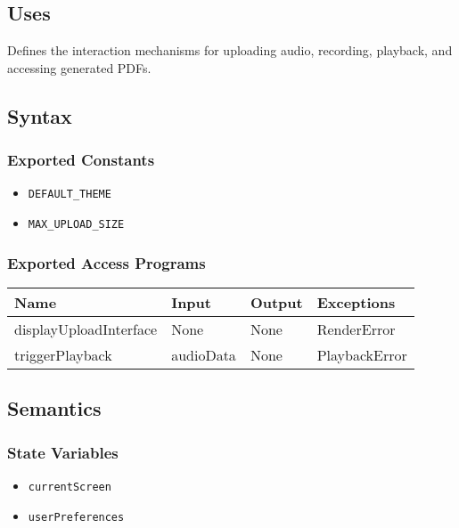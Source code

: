 \documentclass[12pt, titlepage]{article}
\begin{document}
\subsection{Uses}  
Defines the interaction mechanisms for uploading audio, recording, playback, and accessing generated PDFs.  

\subsection{Syntax}  

\subsubsection{Exported Constants}  
\begin{itemize}
    \item \texttt{DEFAULT\_THEME}  
    \item \texttt{MAX\_UPLOAD\_SIZE}  
\end{itemize}  

\subsubsection{Exported Access Programs}  
\begin{center}  
\begin{tabular}{|p{5cm}|p{2cm}|p{4cm}|p{3cm}|}  
\hline  
\textbf{Name} & \textbf{Input} & \textbf{Output} & \textbf{Exceptions} \\  
\hline  
displayUploadInterface & None & None & RenderError \\  
triggerPlayback & audioData & None & PlaybackError \\  
\hline  
\end{tabular}  
\end{center}  

\subsection{Semantics}  

\subsubsection{State Variables}  
\begin{itemize}  
    \item \texttt{currentScreen}  
    \item \texttt{userPreferences}  
\end{itemize}  
\end{document}
